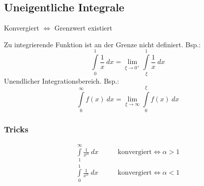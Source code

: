 \subsection{Uneigentliche Integrale}
    \begin{center}
        Konvergiert $\Longleftrightarrow$ Grenzwert existiert
    \end{center}
    
            Zu integrierende Funktion ist an der Grenze nicht definiert. Bsp.:
            $$
                \int\limits_{0}^{1}  \frac{1}{x} \ dx = \lim_{\xi \to 0^+} \int\limits_{\xi}^{1} \frac{1}{x} \ dx
            $$
        Unendlicher Integrationsbereich. Bsp.:
        $$
            \int\limits_{0}^{\infty}  f(x) \ dx = \lim_{\xi \to \infty}\int\limits_{0}^{\xi} f(x) \ dx
        $$
    \subsubsection{Tricks}
        \vspace{-0.5em}
        \begin{align*}
            \int\limits_{1}^{\infty}  \frac{1}{x^\alpha} \ dx  \qquad &\text{konvergiert} \iff \alpha > 1\\
            \int\limits_{0}^{1}  \frac{1}{x^\alpha} \ dx  \qquad &\text{konvergiert} \iff \alpha < 1  
        \end{align*}